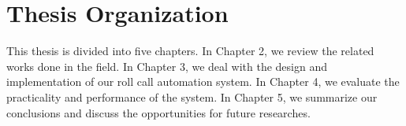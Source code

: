 \section{Thesis Organization}
This thesis is divided into five chapters.
In Chapter 2, we review the related works done in the field.
In Chapter 3, we deal with the design and implementation of our roll call automation system.
In Chapter 4, we evaluate the practicality and performance of the system.
In Chapter 5, we summarize our conclusions and discuss the opportunities for future researches.
